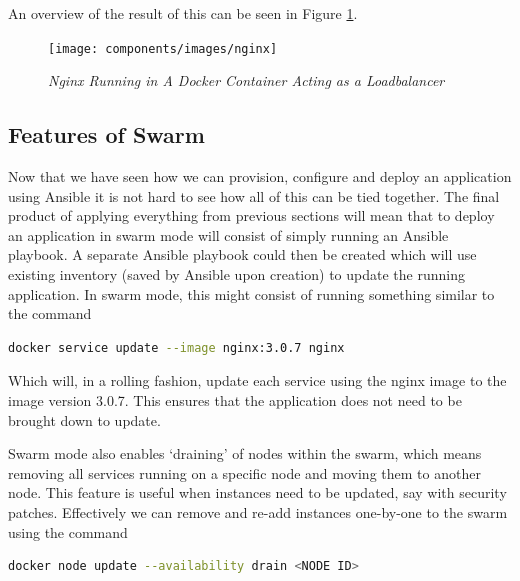 \documentclass{article}
\begin{document}
An overview of the result of this can be seen in Figure \ref{fig:nginx}.

\begin{figure}[!h]
\centering
\texttt{[image: components/images/nginx]}
\caption{\em Nginx Running in A Docker Container Acting as a Loadbalancer}
\label{fig:nginx}
\end{figure}

\subsection{Features of Swarm}
\label{sub:swarm_features}
Now that we have seen how we can provision, configure and deploy an application using Ansible it is not hard to see how all of this can be tied together. The final product of applying everything from previous sections will mean that to deploy an application in swarm mode will consist of simply running an Ansible playbook. A separate Ansible playbook could then be created which will use existing inventory (saved by Ansible upon creation) to update the running application. In swarm mode, this might consist of running something similar to the command

\begin{lstlisting}[language=bash]
  docker service update --image nginx:3.0.7 nginx
\end{lstlisting}

Which will, in a rolling fashion, update each service using the nginx image to the image version 3.0.7. This ensures that the application does not need to be brought down to update.

Swarm mode also enables `draining' of nodes within the swarm, which means removing all services running on a specific node and moving them to another node. This feature is useful when instances need to be updated, say with security patches. Effectively we can remove and re-add instances one-by-one to the swarm using the command

\begin{lstlisting}[language=bash]
  docker node update --availability drain <NODE ID>
\end{lstlisting}
\end{document}
